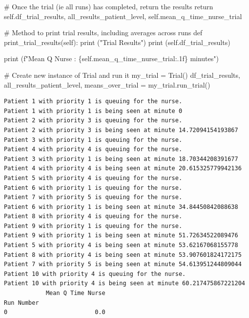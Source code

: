 \documentclass[
  letterpaper,
  DIV=11,
  numbers=noendperiod]{scrreprt}
\newenvironment{Shaded}{}{}
\newcommand{\BuiltInTok}[1]{\textcolor[rgb]{0.84,0.23,0.29}{#1}}
\newcommand{\CommentTok}[1]{\textcolor[rgb]{0.42,0.45,0.49}{#1}}
\newcommand{\ControlFlowTok}[1]{\textcolor[rgb]{0.84,0.23,0.29}{#1}}
\newcommand{\KeywordTok}[1]{\textcolor[rgb]{0.84,0.23,0.29}{#1}}
\newcommand{\NormalTok}[1]{\textcolor[rgb]{0.14,0.16,0.18}{#1}}
\newcommand{\OperatorTok}[1]{\textcolor[rgb]{0.14,0.16,0.18}{#1}}
\newcommand{\SpecialCharTok}[1]{\textcolor[rgb]{0.00,0.36,0.77}{#1}}
\newcommand{\SpecialStringTok}[1]{\textcolor[rgb]{0.01,0.18,0.38}{#1}}
\newcommand{\StringTok}[1]{\textcolor[rgb]{0.01,0.18,0.38}{#1}}
\newcommand{\VariableTok}[1]{\textcolor[rgb]{0.89,0.38,0.04}{#1}}
\begin{document}
\begin{tcolorbox}
\begin{Shaded}
\begin{Highlighting}[]
        \CommentTok{\# Once the trial (ie all runs) has completed, return the results}
        \ControlFlowTok{return} \VariableTok{self}\NormalTok{.df\_trial\_results, all\_results\_patient\_level, }\VariableTok{self}\NormalTok{.mean\_q\_time\_nurse\_trial}

    \CommentTok{\# Method to print trial results, including averages across runs}
    \KeywordTok{def}\NormalTok{ print\_trial\_results(}\VariableTok{self}\NormalTok{):}
        \BuiltInTok{print}\NormalTok{ (}\StringTok{"Trial Results"}\NormalTok{)}
        \BuiltInTok{print}\NormalTok{ (}\VariableTok{self}\NormalTok{.df\_trial\_results)}

        \BuiltInTok{print}\NormalTok{ (}\SpecialStringTok{f"Mean Q Nurse : }\SpecialCharTok{\{}\VariableTok{self}\SpecialCharTok{.}\NormalTok{mean\_q\_time\_nurse\_trial}\SpecialCharTok{:.1f\}}\SpecialStringTok{ minutes"}\NormalTok{)}

\CommentTok{\# Create new instance of Trial and run it}
\NormalTok{my\_trial }\OperatorTok{=}\NormalTok{ Trial()}
\NormalTok{df\_trial\_results, all\_results\_patient\_level, means\_over\_trial  }\OperatorTok{=}\NormalTok{ my\_trial.run\_trial()}
\end{Highlighting}
\end{Shaded}

\begin{verbatim}
Patient 1 with priority 1 is queuing for the nurse.
Patient 1 with priority 1 is being seen at minute 0
Patient 2 with priority 3 is queuing for the nurse.
Patient 2 with priority 3 is being seen at minute 14.72094154193867
Patient 3 with priority 1 is queuing for the nurse.
Patient 4 with priority 4 is queuing for the nurse.
Patient 3 with priority 1 is being seen at minute 18.70344208391677
Patient 4 with priority 4 is being seen at minute 20.615325779942136
Patient 5 with priority 4 is queuing for the nurse.
Patient 6 with priority 1 is queuing for the nurse.
Patient 7 with priority 5 is queuing for the nurse.
Patient 6 with priority 1 is being seen at minute 34.84450842088638
Patient 8 with priority 4 is queuing for the nurse.
Patient 9 with priority 1 is queuing for the nurse.
Patient 9 with priority 1 is being seen at minute 51.72634522089476
Patient 5 with priority 4 is being seen at minute 53.62167068155778
Patient 8 with priority 4 is being seen at minute 53.907601824172175
Patient 7 with priority 5 is being seen at minute 54.613951244809044
Patient 10 with priority 4 is queuing for the nurse.
Patient 10 with priority 4 is being seen at minute 60.217475867221204
            Mean Q Time Nurse
Run Number                   
0                         0.0
\end{verbatim}

\end{tcolorbox}
\end{document}
